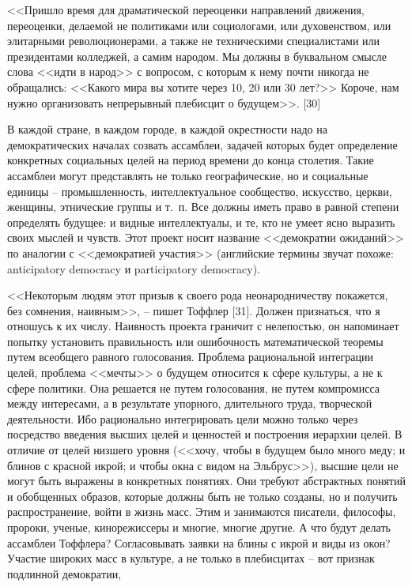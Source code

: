 \documentclass{book}
\begin{document}
<<Пришло время для драматической переоценки направлений движения, переоценки, делаемой не политиками или социоло­гами, или духовенством, или элитарными революционерами, а также не техническими специалистами или президентами кол­леджей, а самим народом. Мы должны в буквальном смысле слова <<идти в народ>> с вопросом, с которым к нему почти ни­когда не обращались: <<Какого мира вы хотите через 10, 20 или 30 лет?>> Короче, нам нужно организовать непрерывный плебис­цит о будущем>>. [30]

В каждой стране, в каждом городе, в каждой окрестности надо на демократических началах созвать ассамблеи, задачей которых будет определение конкретных социальных целей на период времени до конца столетия. Такие ассамблеи могут представлять не только географические, но и социальные единицы -- промышленность, интеллектуальное сообщество, искусство, церкви, женщины, этнические группы и т.~п. Все должны иметь право в равной степени определять будущее: и видные интеллектуалы, и те, кто не умеет ясно выразить своих мыслей и чувств. Этот проект носит название <<демократии ожиданий>> по аналогии с <<демократией участия>> (английские термины звучат похоже: anticipatory democracy и participatory democracy).

<<Некоторым людям этот призыв к своего рода неонародни­честву покажется, без сомнения, наивным>>, -- пишет Тоф­флер [31]. Должен признаться, что я отношусь к их числу. Наив­ность проекта граничит с нелепостью, он напоминает попытку установить правильность или ошибочность математической те­оремы путем всеобщего равного голосования. Проблема раци­ональной интеграции целей, проблема <<мечты>> о будущем от­носится к сфере культуры, а не к сфере политики. Она решает­ся не путем голосования, не путем компромисса между инте­ресами, а в результате упорного, длительного труда, творче­ской деятельности. Ибо рационально интегрировать цели можно только через посредство введения высших целей и ценностей и построения иерархии целей. В отличие от целей низшего уров­ня (<<хочу, чтобы в будущем было много меду; и блинов с крас­ной икрой; и чтобы окна с видом на Эльбрус>>), высшие цели не могут быть выражены в конкретных понятиях. Они требуют абстрактных понятий и обобщенных образов, которые должны быть не только созданы, но и 
получить распространение, войти в жизнь масс. Этим и занимаются писатели, философы, пророки, ученые, кинорежиссеры и многие, многие другие. А что будут делать ассамблеи Тоффлера? Согласовывать заявки на блины с икрой и виды из окон? Участие широких масс в культуре, а не только в плебисцитах -- вот признак подлинной демокра­тии,
\end{document}
